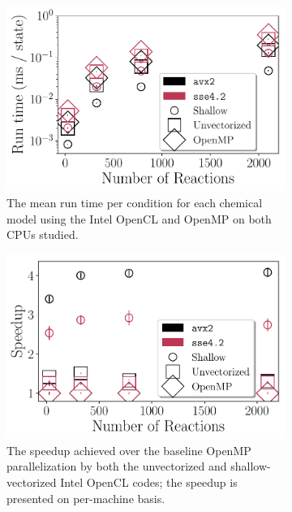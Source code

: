 \documentclass[12pt,number,sort&compress,preprint]{elsarticle}
\begin{document}
\begin{figure}[htbp]
   \centering
  \begin{subfigure}[t]{0.48\linewidth}
      \includegraphics[width=\textwidth]{intel_source_nonorm.pdf}
      \caption{The mean run time per condition for each chemical model using the Intel OpenCL and OpenMP on both CPUs studied.}
      \label{F:intel_source_nonorm}
  \end{subfigure}
  \hfill
  \begin{subfigure}[t]{0.48\linewidth}
      \includegraphics[width=\textwidth]{intel_source.pdf}
      \caption{The speedup achieved over the baseline OpenMP parallelization by both the unvectorized and shallow-vectorized Intel OpenCL codes; the speedup is presented on per-machine basis.}
      \label{F:intel_source}
  \end{subfigure}
  \\
  \begin{subfigure}[t]{0.48\linewidth}

\end{subfigure}
\end{figure}
\end{document}
